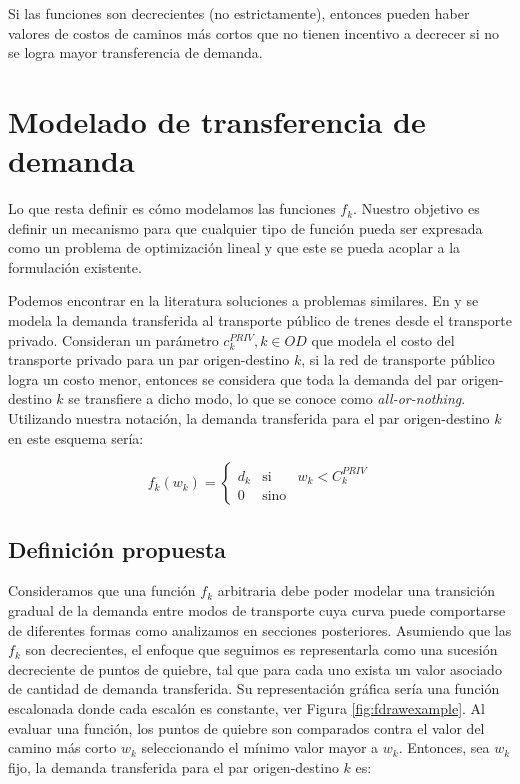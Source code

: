 Si las funciones son decrecientes (no estrictamente), entonces pueden haber valores de costos de caminos más cortos que no tienen incentivo a decrecer si no se logra mayor transferencia de demanda.

\section{Modelado de transferencia de demanda}
\label{sect:transferfunctiondefs}

Lo que resta definir es cómo modelamos las funciones $f_k$. Nuestro objetivo es definir un mecanismo para que cualquier tipo de función pueda ser expresada como un problema de optimización lineal y que este se pueda acoplar a la formulación existente.

Podemos encontrar en la literatura soluciones a problemas similares. En \cite{laporte2007} y \cite{marin2007} se modela la demanda transferida al transporte público de trenes desde el transporte privado. Consideran un parámetro $c^{PRIV}_k, k \in OD$ que modela el costo del transporte privado para un par origen-destino $k$, si la red de transporte público logra un costo menor, entonces se considera que toda la demanda del par origen-destino $k$ se transfiere a dicho modo, lo que se conoce como {\it all-or-nothing}. Utilizando nuestra notación, la demanda transferida para el par origen-destino $k$ en este esquema sería:

\begin{equation}
  \label{eq:allornothing}
  f_k(w_k) = \left\{ \begin{array}{lcr}
    d_k & \mbox{si}   & w_k < C^{PRIV}_k \\
          0 & \mbox{sino} &
  \end{array}
  \right.
\end{equation}

\subsection{Definición propuesta}

Consideramos que una función $f_k$ arbitraria debe poder modelar una transición gradual de la demanda entre modos de transporte cuya curva puede comportarse de diferentes formas como analizamos en secciones posteriores. Asumiendo que las $f_k$ son decrecientes, el enfoque que seguimos es representarla como una sucesión decreciente de puntos de quiebre, tal que para cada uno exista un valor asociado de cantidad de demanda transferida. Su representación gráfica sería una función escalonada donde cada escalón es constante, ver Figura \ref{fig:fdrawexample}. Al evaluar una función, los puntos de quiebre son comparados contra el valor del camino más corto $w_k$ seleccionando el mínimo valor mayor a $w_k$. Entonces, sea $w_k$ fijo, la demanda transferida para el par origen-destino $k$ es:

